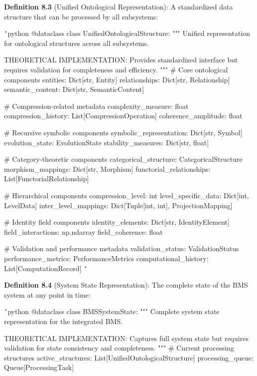 \textbf{Definition 8.3} (Unified Ontological Representation): A standardized data structure that can be processed by all subsystems:

\texttt{`}python
@dataclass
class UnifiedOntologicalStructure:
    """
    Unified representation for ontological structures across all subsystems.
    
    THEORETICAL IMPLEMENTATION: Provides standardized interface
    but requires validation for completeness and efficiency.
    """
    \# Core ontological components
    entities: Dict[str, Entity]
    relationships: Dict[str, Relationship] 
    semantic_content: Dict[str, SemanticContent]
    
    \# Compression-related metadata
    complexity_measure: float
    compression_history: List[CompressionOperation]
    coherence_amplitude: float
    
    \# Recursive symbolic components
    symbolic_representation: Dict[str, Symbol]
    evolution_state: EvolutionState
    stability_measures: Dict[str, float]
    
    \# Category-theoretic components
    categorical_structure: CategoricalStructure
    morphism_mappings: Dict[str, Morphism]
    functorial_relationships: List[FunctorialRelationship]
    
    \# Hierarchical components
    compression_level: int
    level_specific_data: Dict[int, LevelData]
    inter_level_mappings: Dict[Tuple[int, int], ProjectionMapping]
    
    \# Identity field components
    identity_elements: Dict[str, IdentityElement]
    field_interactions: np.ndarray
    field_coherence: float
    
    \# Validation and performance metadata
    validation_status: ValidationStatus
    performance_metrics: PerformanceMetrics
    computational_history: List[ComputationRecord]
\texttt{`}

\textbf{Definition 8.4} (System State Representation): The complete state of the BMS system at any point in time:

\texttt{`}python
@dataclass
class BMSSystemState:
    """
    Complete system state representation for the integrated BMS.
    
    THEORETICAL IMPLEMENTATION: Captures full system state
    but requires validation for state consistency and completeness.
    """
    \# Current processing structures
    active_structures: List[UnifiedOntologicalStructure]
    processing_queue: Queue[ProcessingTask]
    
